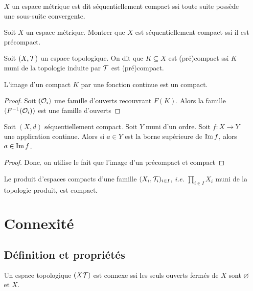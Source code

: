  \begin{definition}
     $X$ un espace métrique est dit séquentiellement compact ssi toute suite possède une sous-suite convergente.
 \end{definition}
 \begin{exercice}
     Soit $X$ un espace métrique. Montrer que $X$ est séquentiellement compact ssi il est précompact.
 \end{exercice}
 \begin{definition}
     Soit $(X,\mathcal{T})$ un espace topologique. On dit que $K\subseteq X$ est (pré)compact ssi $K$ muni de la topologie induite par $\mathcal{T}$ est (pré)compact.
 \end{definition}
 \begin{proposition}
     L'image d'un compact $K$ par une fonction continue est un compact. 
 \end{proposition}
 \begin{proof}
     Soit $(\mathcal{O}_i)$ une famille d'ouverts recouvrant $F(K)$. Alors la famille $(F^{-1}(\mathcal{O}_i))$ est une famille d'ouverts
 \end{proof}

 \begin{proposition}
     Soit $(X,d)$ séquentiellement compact. Soit $Y$ muni d'un ordre. Soit $f : X\to Y$ une application continue. Alors si $a\in Y$ est la borne supérieure de $\operatorname{Im} f$, alors $a\in\operatorname{Im} f$.  
 \end{proposition}
 \begin{proof}
     Donc, on utilise le fait que l'image d'un précompact et compact
 \end{proof}

\begin{theoreme}[Tychonoff]
      Le produit d'espaces compacts d'une famille $(X_i,\mathcal{T}_i)_{i\in I}$, \textit{i.e.} $\prod_{i\in I}X_i$ muni de la topologie produit, est compact. 
  \end{theoreme}

 \section{Connexité}
\subsection{Définition et propriétés}
 \begin{definition}
     Un espace topologique $(X\mathcal{T})$ est connexe ssi les seuls ouverts fermés de $X$ sont $\varnothing$ et $X$.
 \end{definition}

